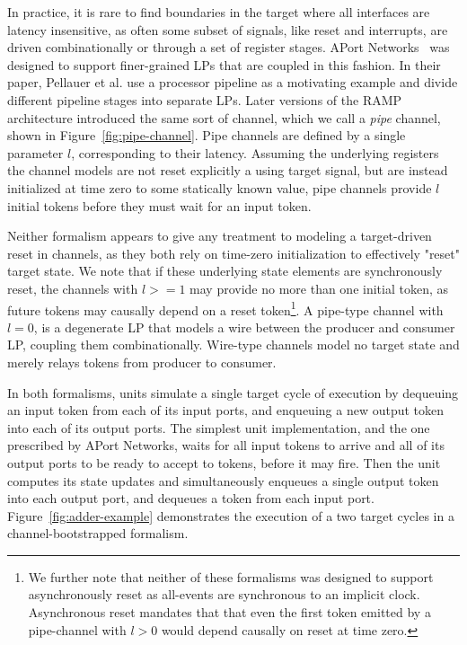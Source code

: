 In practice, it is rare to find boundaries in the target where all
interfaces are latency insensitive, as often some subset of signals, like reset
and interrupts, are driven combinationally or through a set of register stages.
APort Networks~\cite{APortNetworks} was designed to support
finer-grained LPs that are coupled in this fashion. In their
paper, Pellauer et al. use a processor pipeline as a motivating example and
divide different pipeline stages into separate LPs. Later versions of the RAMP
architecture introduced the same sort of channel, which we call a \emph{pipe}
channel, shown in Figure~\ref{fig:pipe-channel}.  Pipe channels are defined by
a single parameter $l$, corresponding to their latency. Assuming the underlying
registers the channel models are not reset explicitly a using target signal, but are
instead initialized at time zero to some statically known value, pipe channels
provide $l$ initial tokens before they must wait for an input token.

Neither formalism appears to give any treatment to modeling a target-driven reset in
channels, as they both rely on time-zero initialization to effectively
"reset" target state.  We note that if these underlying state elements are
synchronously reset, the channels with $l >= 1$ may provide no more than one
initial token, as future tokens may causally depend on a reset
token\footnote{We further note that neither of these formalisms was designed
to support asynchronously reset as all-events are synchronous to an implicit
clock. Asynchronous reset mandates that that even
the first token emitted by a pipe-channel with $l > 0$ would depend causally
on reset at time zero.}. A pipe-type channel with $l = 0$, is a degenerate LP
that models a wire between the producer and consumer LP, coupling them
combinationally. Wire-type channels model no target state and merely relays tokens from producer to consumer.

In both formalisms, units simulate a single target cycle of execution by dequeuing an input token
from each of its input ports, and enqueuing a new output token into each of
its output ports. The simplest unit implementation, and the one prescribed by
APort Networks, waits for all input tokens to arrive and all of its output
ports to be ready to accept to tokens, before it may fire. Then the
unit computes its state updates and simultaneously enqueues a single output
token into each output port, and dequeues a token from each input port.
Figure~\ref{fig:adder-example} demonstrates the execution of a two target cycles in a channel-bootstrapped formalism.

